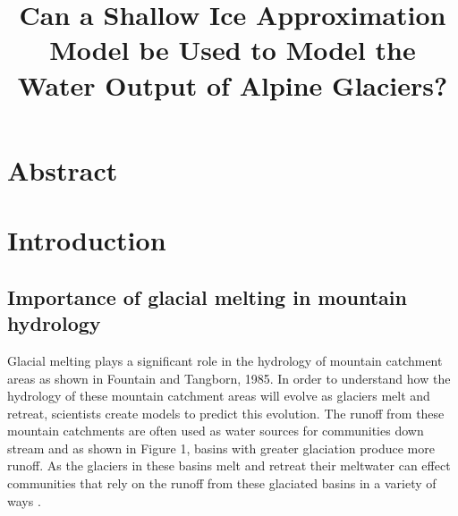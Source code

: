 \documentclass{article}
\title{Can a Shallow Ice Approximation Model be Used to Model the Water Output of Alpine Glaciers?}
\author{}
\date{}
\begin{document}
\maketitle

\section*{Abstract}

\section{Introduction}
\subsection{Importance of glacial melting in mountain hydrology}
Glacial melting plays a significant role in the hydrology of mountain catchment areas as shown in Fountain and Tangborn, 1985. In order to 
understand how the hydrology of these mountain catchment areas will evolve as glaciers melt and retreat, scientists create models to predict 
this evolution. The runoff from these mountain catchments are often used as water sources for communities down stream \cite{ref1} and as shown in 
Figure 1, basins with greater glaciation produce more runoff. As the glaciers in these basins melt and retreat their meltwater can effect 
communities that rely on the runoff from these glaciated basins in a variety of ways \cite{ref2}.
\end{document}
